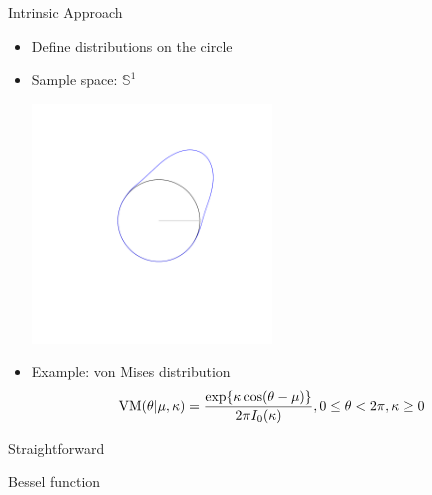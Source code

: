 \documentclass{beamer}
\begin{document}
\begin{frame}{Intrinsic Approach}

\begin{itemize}

\item Define distributions on the circle
\pause
\item Sample space: $\mathbb{S}^1$
\pause

\includegraphics[width=0.5\textwidth, clip=true, trim = 3cm 6cm 3cm 3.3cm]{vonMises.pdf}

\pause

\item Example: von Mises distribution \pause
$$ \textnormal{VM}(\theta \vert \mu, \kappa) = \frac{  \exp\{\kappa \cos(\theta - \mu)\} }{2 \pi I_0(\kappa) } , 0\leq \theta < 2\pi, \kappa \geq 0$$

\end{itemize}



\begin{description}
\pause
\item[Pro] Straightforward
\pause
\item[Con] Bessel function 

\end{description}

\end{frame}
\end{document}
